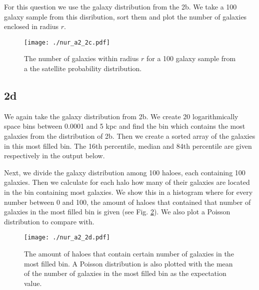 For this question we use the galaxy distribution from the 2b. We take a 100 galaxy sample from this disribution, sort them and plot the number of galaxies enclosed in radius $r$.

\begin{figure}[!ht]
  \centering
  \texttt{[image: ./nur\_a2\_2c.pdf]}
  \caption{The number of galaxies within radius $r$ for a 100 galaxy sample from a the satellite probability distribution.}
  \label{fig:2c}
\end{figure}

\newpage

\subsection{2d}



We again take the galaxy distribution from 2b. We create 20 logarithmically space bins between 0.0001 and 5 kpc and find the bin which contains the most galaxies from the distribution of 2b. Then we create a sorted array of the galaxies in this most filled bin. The 16th percentile, median and 84th percentile are given respectively in the output below.



Next, we divide the galaxy distribution among 100 haloes, each containing 100 galaxies. Then we calculate for each halo how many of their galaxies are located in the bin containing most galaxies. We show this in a histogram where for every number between 0 and 100, the amount of haloes that contained that number of galaxies in the most filled bin is given (see Fig. \ref{fig:2d}). We also plot a Poisson distribution to compare with.

\begin{figure}[!ht]
  \centering
  \texttt{[image: ./nur\_a2\_2d.pdf]}
  \caption{The amount of haloes that contain certain number of galaxies in the most filled bin. A Poisson distribution is also plotted with the mean of the number of galaxies in the most filled bin as the expectation value.}
  \label{fig:2d}
\end{figure}

